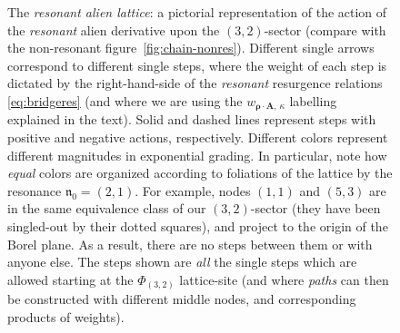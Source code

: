 \documentclass[11pt,a4paper]{article}
\newcommand{\nres}{\boldsymbol{\mathfrak{n}}_0}
\begin{document}
\begin{figure}[t!]
\caption{The \textit{resonant alien lattice}: a pictorial representation of the action of the \textit{resonant} alien derivative upon the $(3,2)$-sector (compare with the non-resonant figure~\ref{fig:chain-nonres}). Different single arrows correspond to different single steps, where the weight of each step is dictated by the right-hand-side of the \textit{resonant} resurgence relations \eqref{eq:bridgeres} (and where we are using the $w_{\boldsymbol{\rho} \cdot \boldsymbol{A},\, \kappa}$ labelling explained in the text). Solid and dashed lines represent steps with positive and negative actions, respectively. Different colors represent different magnitudes in exponential grading. In particular, note how \textit{equal} colors are organized according to foliations of the lattice by the resonance $\nres = (2,1)$. For example, nodes $(1,1)$ and $(5,3)$ are in the same equivalence class of our $(3,2)$-sector (they have been singled-out by their dotted squares), and project to the origin of the Borel plane. As a result, there are no steps between them or with anyone else. The steps shown are \textit{all} the single steps which are allowed starting at the $\Phi_{(3,2)}$ lattice-site (and where \textit{paths} can then be constructed with different middle nodes, and corresponding products of weights).
}
\label{fig:chain-res}
\end{figure}
\end{document}
